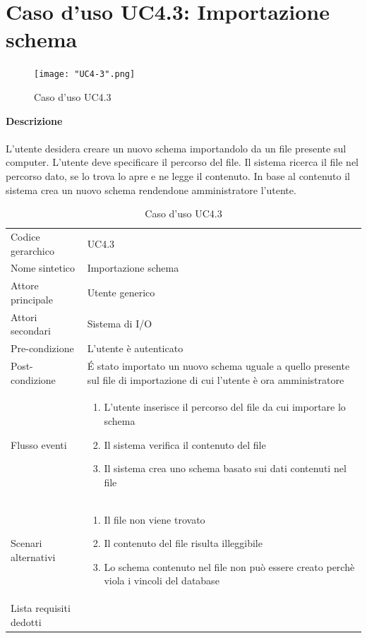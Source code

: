 \documentclass[a4paper]{report}
\begin{document}
	 \section{Caso d'uso UC4.3: Importazione schema}
	 	\begin{figure}[H]
			\centering
			\texttt{[image: "UC4-3".png]}
			\caption{Caso d'uso UC4.3}
		\end{figure}
	 \textbf{Descrizione} \\ \\
	 L'utente desidera creare un nuovo schema importandolo da un file presente sul computer. L'utente
	  deve specificare il percorso del file. Il sistema ricerca il file nel percorso dato, se lo trova lo apre e ne 
	  legge il contenuto. In base al contenuto il sistema crea un nuovo schema rendendone amministratore
	  l'utente.
		\begin{table}[H]
		\begin{tabularx}{\textwidth}{X | X}\toprule
			\rowcolor{orange!65}Codice gerarchico & UC4.3 \\
			Nome sintetico & Importazione schema \\
			\rowcolor{orange!65}Attore principale & Utente generico\\
			Attori secondari & Sistema di I/O \\
			\rowcolor{orange!65}Pre-condizione & L'utente è autenticato\\
			Post-condizione & \'E stato importato un nuovo schema uguale a quello presente sul file di
			 importazione di cui l'utente è ora amministratore \\
			\rowcolor{orange!65}Flusso eventi & \begin{enumerate}
			\item L'utente inserisce il percorso del file da cui importare lo schema
			\item Il sistema verifica il contenuto del file
			\item Il sistema crea uno schema basato sui dati contenuti nel file
			\end{enumerate} \\
			Scenari alternativi & \begin{enumerate}
			\item Il file non viene trovato
			\item Il contenuto del file risulta illeggibile
			\item Lo schema contenuto nel file non può essere creato perchè viola i vincoli del database
			\end{enumerate} \\
			\rowcolor{orange!65}Lista requisiti dedotti & \\
			\bottomrule
		\end{tabularx}
		\caption{Caso d'uso UC4.3}
	 \end{table}
\end{document}
